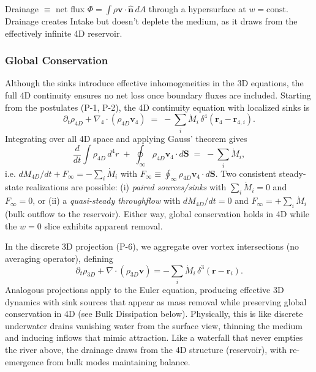 Drainage $\equiv$ net flux $\Phi = \int \rho \mathbf{v} \cdot \hat{\mathbf{n}} \, dA$ through a hypersurface at $w = \text{const}$. Drainage creates Intake but doesn't deplete the medium, as it draws from the effectively infinite 4D reservoir.

\subsubsection{Global Conservation}
Although the sinks introduce effective inhomogeneities in the 3D equations, the full 4D continuity ensures no net loss once boundary fluxes are included. Starting from the postulates (P-1, P-2), the 4D continuity equation with localized sinks is
\begin{equation}
\partial_t \rho_{4D}+\nabla_4 \!\cdot (\rho_{4D}\mathbf{v}_4)\;=\;-\sum_i \dot{M}_i\,\delta^4(\mathbf{r}_4-\mathbf{r}_{4,i}).
\end{equation}
Integrating over all 4D space and applying Gauss' theorem gives
\begin{equation}
\frac{d}{dt}\!\int \rho_{4D}\,d^4 r\;+\;\oint_{\infty}\rho_{4D}\mathbf{v}_4\!\cdot d\mathbf{S}\;=\;-\sum_i \dot M_i,
\end{equation}
i.e. $dM_{4D}/dt+F_\infty=-\sum_i\dot M_i$ with $F_\infty\equiv\oint_{\infty}\rho_{4D}\mathbf{v}_4\!\cdot d\mathbf{S}$. Two consistent steady-state realizations are possible: (i) \emph{paired sources/sinks} with $\sum_i \dot M_i=0$ and $F_\infty=0$, or (ii) a \emph{quasi-steady throughflow} with $dM_{4D}/dt=0$ and $F_\infty=+\sum_i \dot M_i$ (bulk outflow to the reservoir). Either way, global conservation holds in 4D while the $w=0$ slice exhibits apparent removal.

In the discrete 3D projection (P-6), we aggregate over vortex intersections (no averaging operator), defining
\begin{equation}
\partial_t \rho_{3D} + \nabla \!\cdot (\rho_{3D}\mathbf{v}) = -\sum_i \dot{M}_i\,\delta^3(\mathbf{r}-\mathbf{r}_i).
\end{equation}
Analogous projections apply to the Euler equation, producing effective 3D dynamics with sink sources that appear as mass removal while preserving global conservation in 4D (see Bulk Dissipation below). Physically, this is like discrete underwater drains vanishing water from the surface view, thinning the medium and inducing inflows that mimic attraction. Like a waterfall that never empties the river above, the drainage draws from the 4D structure (reservoir), with re-emergence from bulk modes maintaining balance.

